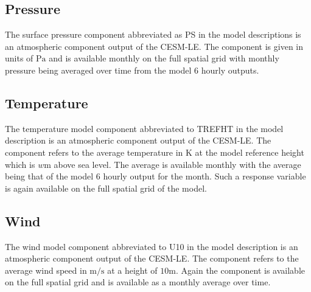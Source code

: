 \subsection{Pressure \label{ssec:pressure}}
The surface pressure component abbreviated as PS in the model descriptions is an atmospheric component output of the CESM-LE. The component is given in units of $\si{\pascal}$ and is available monthly on the full spatial grid with monthly pressure being averaged over time from the model 6 hourly outputs.
\subsection{Temperature \label{ssec:temp}}
The temperature model component abbreviated to TREFHT in the model description is an atmospheric component output of the CESM-LE. The component refers to the average temperature in $\si{\kelvin}$ at the model reference height which is $w\si{\meter}$ above sea level. The average is available monthly with the average being that of the model 6 hourly output for the month. Such a response variable is again available on the full spatial grid of the model. 

\subsection{Wind \label{ssec:wind}}
The wind model component abbreviated to U10 in the model description is an atmospheric component output of the CESM-LE. The component refers to the average wind speed in $\si{\meter\per\second}$ at a height of $10\si{\meter}$. Again the component is available on the full spatial grid and is available as a monthly average over time.
 
 
